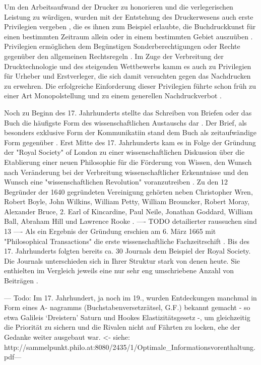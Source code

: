 Um den Arbeitsaufwand der Drucker zu honorieren und die verlegerischen Leistung zu würdigen\cite{szilagyi_2011_leistungsschutzrecht}, wurden mit der Entstehung des Druckerwesens auch erste Privilegien vergeben \cite{gieseke_1995_privileg}, die es ihnen zum Beispiel erlaubte, die Buchdruckkunst für einen bestimmten Zeitraum allein oder in einem bestimmten Gebiet auszuüben \cite{martin2008publizistische} \cite{koller_1995_Urheberrecht}. Privilegien ermöglichen dem Begünstigen Sonderberechtigungen oder Rechte gegenüber den allgemeinen Rechtsregeln \cite{jänich_2002_geistiges}. Im Zuge der Verbreitung der Drucktechnologie und des steigenden Wettbewerbs kamm es auch zu Privilegien für Urheber und Erstverleger, die sich damit versuchten gegen das Nachdrucken zu erwehren. Die erfolgreiche Einforderung dieser Privilegien führte schon früh zu einer Art Monopolstellung  und zu einem generellen Nachdruckverbot \cite{szilagyi_2011_leistungsschutzrecht}.

Noch zu Beginn des 17. Jahrhunderts stellte das Schreiben von Briefen oder das Buch die häufigste Form des wissenschaftlichen Austauschs dar \cite{porter_1964_scientific}. Der Brief, als besonders exklusive Form der Kommunikatiin stand dem Buch als zeitaufwändige Form gegenüber \cite{fecher_hiig_2014}. Erst Mitte des 17. Jahrhunderts kam es in Folge der Gründung der "Royal Society" of London zu einer wissenschaftlichen Diskussion über die Etablierung einer neuen Philosophie für die Förderung von Wissen, den Wunsch nach Veränderung bei der Verbreitung wissenschaftlicher Erkenntnisse und den Wunsch eine "wissenschaftlichen Revolution" voranzutreiben \cite{Dear_1985}. Zu den 12 Begründer der 1640 gegründeten Vereinigung gehörten neben Christopher Wren, Robert Boyle, John Wilkins, William Petty, William Brouncker, Robert Moray, Alexander Bruce, 2. Earl of Kincardine, Paul Neile, Jonathan Goddard, William Ball, Abraham Hill und Lawrence Rooke \cite{suchen}. ---- TODO detailierter raussuchen sind 13 ---- Als ein Ergebnis der Gründung erschien am 6. März 1665 mit "Philosophical Transactions" die erste wissenschaftliche Fachzeitrschift \cite{suchen}. Bis des 17. Jahrhunderts folgten bereits ca. 30 Journals dem Beispiel der Royal Society. Die Journals unterschieden sich in Ihrer Struktur stark von denen heute. Sie enthielten im Vergleich jeweils eine nur sehr eng umschriebene Anzahl von Beiträgen \cite{suchen}.

--- Todo: Im 17. Jahrhundert, ja noch im 19., wurden Entdeckungen manchmal in Form eines A- nagramms (Buchstabenversetzrätsel, G.F.) bekannt gemacht - so etwa Galileis ‘Dreistern’ Saturn und Hookes Elastizitätsgesetz -, um gleichzeitig die Priorität zu sichern und die Rivalen nicht auf Fährten zu locken, ehe der Gedanke weiter ausgebaut war. <- siehe: http://sammelpunkt.philo.at:8080/2435/1/Optimale_Informationsvorenthaltung.pdf---

